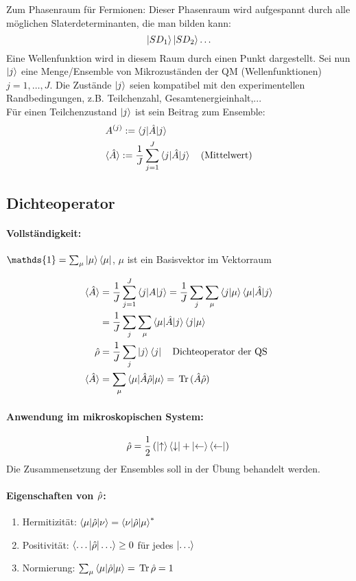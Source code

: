 Zum Phasenraum für Fermionen:
Dieser Phasenraum wird aufgespannt durch alle möglichen Slaterdeterminanten, die man
bilden kann: 
\[{}
    \ket{SD_{1}} \ket{SD_{2}} \dots{}
\]
Eine Wellenfunktion wird in diesem Raum durch einen Punkt dargestellt.
Sei nun $\ket{j}$ eine Menge/Ensemble von Mikrozuständen der QM (Wellenfunktionen)
$j = 1,\dots, J$. Die Zustände $\ket{j}$ seien kompatibel mit den experimentellen 
Randbedingungen, z.B. Teilchenzahl, Gesamtenergieinhalt,...\\
Für einen Teilchenzustand $\ket{j}$ ist sein Beitrag zum Ensemble:
\begin{align*}
    &A^{(j)} := \braket{j | \hat{A} | j}\\
    &\langle \hat{A} \rangle := \frac{1}{J} \sum_{j=1}^{J} \braket{j| \hat{A} | j} \quad 
    \text{(Mittelwert)}
\end{align*}

    \subsection{Dichteoperator}

\paragraph{Vollständigkeit:} $\mathds{1} = \sum_{\mu} \ket{\mu} \bra{\mu}$, $\mu$ 
ist ein Basisvektor im Vektorraum

\begin{align*}
    \langle \hat{A} \rangle&= \frac{1}{J} \sum_{j=1}^{J} \braket{j | A | j} = \frac{1}{J} 
               \sum_{j} \sum_{\mu} \braket{j|\mu}\braket{\mu|\hat{A}|j}\\
    \quad   &= \frac{1}{J} \sum_{j} \sum_{\mu} \braket{\mu|\hat{A}|j}\braket{j|\mu}\\
    \hat{\rho}    &= \frac{1}{J} \sum_{j} \ket{j}\bra{j} \quad 
              \text{Dichteoperator der QS}\\
    \langle \hat{A} \rangle&= \sum_{\mu} \braket{\mu| \hat{A} \hat{\rho} |\mu} = \, \text{Tr} \, (\hat{A} \hat{\rho})
\end{align*}

\paragraph{Anwendung im mikroskopischen System:}
\[{}
    \hat{\rho} = \frac12 \left( \ket{\uparrow} \bra{\downarrow} + \ket{\leftarrow} 
                           \bra{\leftarrow} \right){}
\]
{}
Die Zusammensetzung der Ensembles soll in der Übung behandelt werden.

\paragraph{Eigenschaften von $\hat{\rho}$:}
\begin{enumerate}
    \item Hermitizität: $\braket{\mu|\hat{\rho}|\nu} = \braket{\nu|\hat{\rho}|\mu}^{*}$\\
    \item Positivität: $\braket{\dots|\hat{\rho}|\dots} \geq 0$ für jedes 
          $\ket{\dots}$\\
    \item Normierung: $\sum_{\mu} \braket{\mu|\hat{\rho}|\mu} = \, \text{Tr} \, \hat{\rho} = 1$
\end{enumerate}

